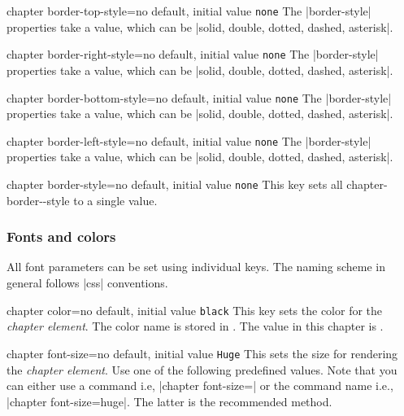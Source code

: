 \begin{docKey}[phd]{chapter border-top-style}{=}{no default, initial value \texttt{none}}
The |border-style| properties take a value, which can be |solid, double, dotted, dashed, asterisk|.
\end{docKey}

\begin{docKey}[phd]{chapter border-right-style}{=}{no default, initial value \texttt{none}}
The |border-style| properties take a value, which can be |solid, double, dotted, dashed, asterisk|.
\end{docKey}

\begin{docKey}[]{chapter border-bottom-style}{=}{no default, initial value \texttt{none}}
The |border-style| properties take a value, which can be |solid, double, dotted, dashed, asterisk|.
\end{docKey}

\begin{docKey}[]{chapter border-left-style}{=}{no default, initial value \texttt{none}}
The |border-style| properties take a value, which can be |solid, double, dotted, dashed, asterisk|.
\end{docKey}

\begin{docKey}[phd]{chapter border-style}{=}{no default, initial value \texttt{none}}
This key sets all chapter-border--style to a single value.
\end{docKey}

\subsubsection{Fonts and colors}

All font parameters can be set using individual keys. The naming scheme in general follows |css| conventions.

\begin{docKey}[phd]{chapter color}{=}{no default, initial value \texttt{black}}
This key sets the color for the \textit{chapter element}. The color name is stored in \cmd{\chaptercolor@cx}.
The value in this chapter is \makeatletter\texttt{\chaptercolor@cx}\makeatother.
\end{docKey}

\begin{docKey}[phd]{chapter font-size}{=}{no default, initial value \texttt{Huge}}
This sets the size for rendering the \textit{chapter element}. Use one of the following predefined values.
Note that you can either use a command i.e, |chapter font-size=|\cmd{\huge} 
or the command name i.e., |chapter font-size=huge|. The latter is the recommended method.
\end{docKey}

